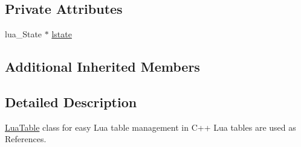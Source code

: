 \subsection*{Private Attributes}
\begin{DoxyCompactItemize}
\item 
lua\+\_\+\+State $\ast$ \hyperlink{classZeta_1_1LuaTable_a8530dc5cd0c6dc37be20d0b771bfad82}{lstate}
\end{DoxyCompactItemize}
\subsection*{Additional Inherited Members}


\subsection{Detailed Description}
\hyperlink{classZeta_1_1LuaTable}{Lua\+Table} class for easy Lua table management in C++ Lua tables are used as References. 

